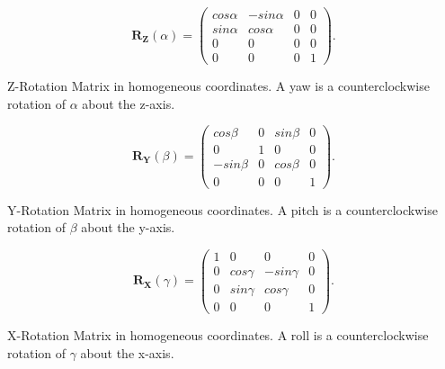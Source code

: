 \begin{Equation}[!htb]
	\centering
	\begin{equation} \label{eq:rotx}
	\bm{R_Z}(\alpha) =
        \begin{pmatrix}
            cos\alpha & -sin\alpha & 0 & 0 \\
            sin\alpha & cos\alpha & 0 & 0 \\
            0 & 0 & 0 & 0 \\
            0 & 0 & 0 & 1 
        \end{pmatrix} .
	\end{equation}
	\caption[Z-Rotation Matrix in homogeneous coordinates.]{Z-Rotation Matrix in homogeneous coordinates. A yaw is a counterclockwise rotation of $\alpha$ about the z-axis.}
\end{Equation}

\begin{Equation}[!htb]
	\centering
	\begin{equation} \label{eq:roty}
	\bm{R_Y}(\beta) =
        \begin{pmatrix}
            cos\beta & 0 & sin\beta & 0 \\
            0 & 1 & 0 & 0 \\
            -sin\beta & 0 & cos\beta & 0 \\
            0 & 0 & 0 & 1 
        \end{pmatrix} .
	\end{equation}
	\caption[Y-Rotation Matrix in homogeneous coordinates.]{Y-Rotation Matrix in homogeneous coordinates. A pitch is a counterclockwise rotation of $\beta$ about the y-axis.}
\end{Equation}

\begin{Equation}[!htb]
	\centering
	\begin{equation} \label{eq:rotz}
	\bm{R_X}(\gamma) =
        \begin{pmatrix}
            1 & 0 & 0 & 0 \\
            0 & cos\gamma & -sin\gamma & 0 \\
            0 & sin\gamma & cos\gamma & 0 \\
            0 & 0 & 0 & 1 
        \end{pmatrix} .
	\end{equation}
	\caption[X-Rotation Matrix in homogeneous coordinates.]{X-Rotation Matrix in homogeneous coordinates. A roll is a counterclockwise rotation of $\gamma$ about the x-axis.}
\end{Equation} 


